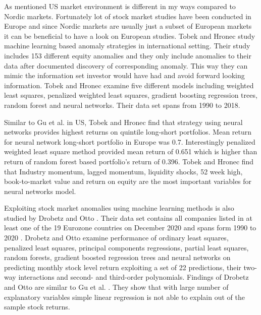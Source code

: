 \documentclass{article}
\begin{document}
As mentioned US market environment is different in my ways compared to Nordic markets. Fortunately lot of stock market studies have been conducted in Europe and since Nordic markets are usually just a subset of European markets it can be beneficial to have a look on European studies. Tobek and Hronec \citeyear{TOBEK2021100588} study machine learning based anomaly strategies in international setting. Their study includes 153 different equity anomalies and they only include anomalies to their data after documented discovery of corresponding anomaly. This way they can mimic the information set investor would have had and avoid forward looking information. Tobek and Hronec examine five different models including weighted least squares, penalized weighted least squares, gradient boosting regression trees, random forest and neural networks. Their data set spans from 1990 to 2018. \par

Similar to Gu et al. \citeyear{guetal} in US, Tobek and Hronec find that strategy using neural networks provides highest returns on quintile long-short portfolios. Mean return for neural network long-short portfolio in Europe was 0.7. Interestingly penalized weighted least square method provided mean return of 0.651 which is higher than return of random forest based portfolio's return of 0.396. Tobek and Hronec find that Industry momentum, lagged momentum, liquidity shocks, 52 week high, book-to-market value and return on equity are the most important variables for neural networks model.\footnotemark \par


Exploiting stock market anomalies using machine learning methods is also studied by Drobetz and Otto \citeyear{Drobetz}. Their data set contains all companies listed in at least one of the 19 Eurozone countries on December 2020 and spans form 1990 to 2020 \footnotemark. Drobetz and Otto examine performance of ordinary least squares, penalized least squares, principal components regressions, partial least squares, random forests, gradient boosted regression trees and neural networks on predicting monthly stock level return exploiting a set of 22 predictions, their two-way interactions and second- and third-order polynomials. Findings of Drobetz and Otto are similar to Gu et al. \citeyear{guetal}. They show that with large number of explanatory variables simple linear regression is not able to explain out of the sample stock returns. \par
\end{document}

